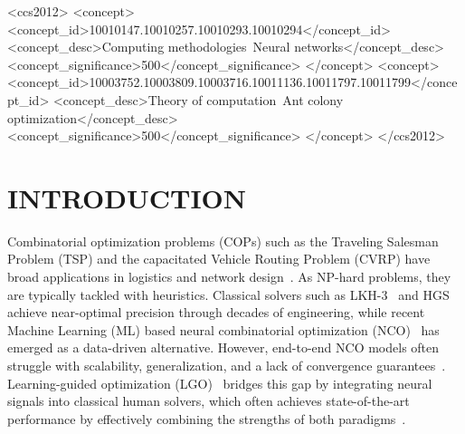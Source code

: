 \documentclass[sigconf,review]{acmart}
\newcommand{\TSP}{\textsc{TSP}}
\newcommand{\CVRP}{\textsc{CVRP}}
\begin{document}
\begin{CCSXML}
<ccs2012>
   <concept>
       <concept_id>10010147.10010257.10010293.10010294</concept_id>
       <concept_desc>Computing methodologies~Neural networks</concept_desc>
       <concept_significance>500</concept_significance>
   </concept>
   <concept>
       <concept_id>10003752.10003809.10003716.10011136.10011797.10011799</concept_id>
       <concept_desc>Theory of computation~Ant colony optimization</concept_desc>
       <concept_significance>500</concept_significance>
   </concept>
 </ccs2012>
\end{CCSXML}



\maketitle



\section{INTRODUCTION}

Combinatorial optimization problems (COPs) such as the Traveling Salesman Problem (\TSP{}) and the capacitated Vehicle Routing Problem (\CVRP{}) have broad applications in logistics and network design~\cite{TSPAPP}.
As NP-hard problems, they are typically tackled with heuristics.
Classical solvers such as LKH-3~\cite{lkhtsp, lkhcvrp} and HGS~\cite{hgs} achieve near-optimal precision through decades of engineering, while recent Machine Learning (ML) based neural combinatorial optimization (NCO)~\cite{MLCO, RL4CO,neuopt,2optlearning} has emerged as a data-driven alternative. However, end-to-end NCO models often struggle with scalability, generalization, and a lack of convergence guarantees~\cite{RL4CO}. Learning-guided optimization (LGO)~\cite{learn2branch, learn2delegate, learn2optimize, neurolkh, li2023learning} bridges this gap by integrating neural signals into classical human solvers, which often achieves state-of-the-art performance by effectively combining the strengths of both paradigms~\cite{learn2delegate,deepaco,learn2seg,huang2024contrastive}.
\end{document}
